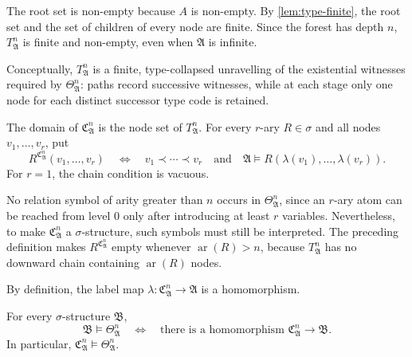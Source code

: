 \documentclass{lmcs}
\newcommand{\A}{\mathfrak{A}}
\newcommand{\B}{\mathfrak{B}}
\newcommand{\C}{\mathfrak{C}}
\begin{document}
The root set is non-empty because $A$ is non-empty.  By
\cref{lem:type-finite}, the root set and the set of children of every node are
finite.  Since the forest has depth $n$, $T_{\A}^{n}$ is finite and non-empty,
even when $\A$ is infinite.

Conceptually, $T_{\A}^{n}$ is a finite, type-collapsed unravelling of the
existential witnesses required by $\Theta_{\A}^{n}$: paths record successive
witnesses, while at each stage only one node for each distinct successor type
code is retained.

\begin{defi}\label{def:canonical-structure}
The domain of $\C_{\A}^{n}$ is the node set of $T_{\A}^{n}$.  For every
$r$-ary $R\in\sigma$ and all nodes $v_1,\ldots,v_r$, put
\[
  R^{\C_{\A}^{n}}(v_1,\ldots,v_r)
  \quad\Longleftrightarrow\quad
  v_1\prec\cdots\prec v_r
  \quad\text{and}\quad
  \A\models R(\lambda(v_1),\ldots,\lambda(v_r)).
\]
For $r=1$, the chain condition is vacuous.
\end{defi}

No relation symbol of arity greater than $n$ occurs in $\Theta_{\A}^{n}$,
since an $r$-ary atom can be reached from level $0$ only after introducing at
least $r$ variables.  Nevertheless, to make $\C_{\A}^{n}$ a
$\sigma$-structure, such symbols must still be interpreted.  The preceding
definition makes $R^{\C_{\A}^{n}}$ empty whenever $\operatorname{ar}(R)>n$,
because $T_{\A}^{n}$ has no downward chain containing
$\operatorname{ar}(R)$ nodes.

By definition, the label map
$\lambda:\C_{\A}^{n}\longrightarrow\A$ is a homomorphism.

\begin{lem}\label{lem:canonical-query}
For every $\sigma$-structure $\B$,
\[
   \B\models\Theta_{\A}^{n}
   \quad\Longleftrightarrow\quad
   \text{there is a homomorphism }\C_{\A}^{n}\longrightarrow\B.
\]
In particular, $\C_{\A}^{n}\models\Theta_{\A}^{n}$.

\end{lem}
\end{document}

